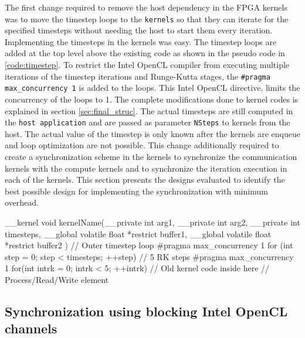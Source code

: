 The first change required to remove the host dependency in the FPGA kernels was
to move the timestep loops to the \texttt{kernels} so that
they can iterate for the specified timesteps without needing the host to start them
every iteration. Implementing the timesteps in the kernels was easy. The timestep loops
are added at the top level above the existing code as shown in the pseudo code in \ref{code:timestep}.
To restrict the Intel OpenCL compiler from executing multiple iterations of the timestep iterations
and Runge-Kutta stages, the \texttt{\#pragma max\_concurrency 1} is added to the loops. This
Intel OpenCL directive, limits the concurrency of the loops to 1.
The complete modifications done to kernel codes is explained in section \ref{sec:final_struc}.
The actual timesteps are still computed in the \texttt{host application} and are passed as
parameter \texttt{NSteps} to kernels from the host. The actual value of the timestep is only known
after the kernels are enqueue and loop optimization are not possible. This change
additionally required to create a synchronization scheme in the kernels
to synchronize the communication kernels with the compute kernels
and to synchronize the iteration execution in each of the kernels.
This section presents the designs evaluated to identify the
best possible design for implementing the synchronization with
minimum overhead.

\begin{CppCode}[caption=Pseudo-code of kernel showing additional timestep loops added for
    creating FPGA only design, frame=tlrb, label=code:timestep, float]
__kernel void kernelName(__private int arg1,
                         __private int arg2,
                         __private int timesteps,
                         __global volatile float  *restrict buffer1,
                         __global volatile float  *restrict buffer2
                        )
{
    // Outer timestep loop
    #pragma max_concurrency 1
    for (int step = 0; step < timesteps; ++step)
    {
        // 5 RK steps
        #pragma max_concurrency 1
        for(int intrk = 0; intrk < 5; ++intrk)
        {
            // Old kernel code inside here
            // Process/Read/Write element
        }
    }
}
\end{CppCode}

\subsection{Synchronization using blocking Intel OpenCL channels}
\label{sec:sync_iochan}

